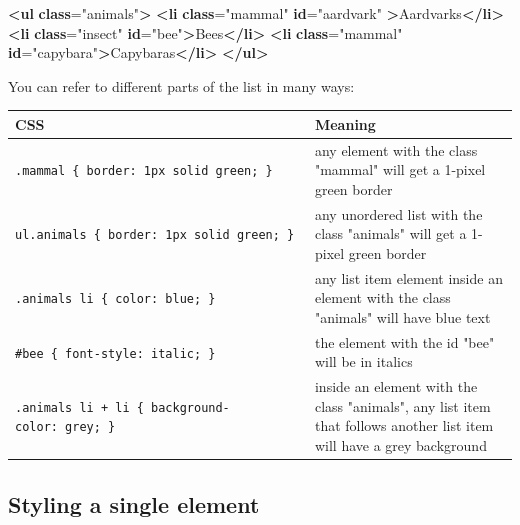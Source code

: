 \documentclass[
  oneside]{book}
\newenvironment{Shaded}{\begin{snugshade}}{\end{snugshade}}
\newcommand{\AttributeTok}[1]{\textcolor[rgb]{0.77,0.63,0.00}{#1}}
\newcommand{\ErrorTok}[1]{\textcolor[rgb]{0.64,0.00,0.00}{\textbf{#1}}}
\newcommand{\KeywordTok}[1]{\textcolor[rgb]{0.13,0.29,0.53}{\textbf{#1}}}
\newcommand{\NormalTok}[1]{#1}
\newcommand{\OtherTok}[1]{\textcolor[rgb]{0.56,0.35,0.01}{#1}}
\newcommand{\StringTok}[1]{\textcolor[rgb]{0.31,0.60,0.02}{#1}}
\begin{document}
\begin{Shaded}
\begin{Highlighting}[]
\KeywordTok{\textless{}ul} \ErrorTok{class}\OtherTok{=}\StringTok{"animals"}\KeywordTok{\textgreater{}}
    \KeywordTok{\textless{}li} \ErrorTok{class}\OtherTok{=}\StringTok{"mammal"} \ErrorTok{id}\OtherTok{=}\StringTok{"aardvark"} \KeywordTok{\textgreater{}}\NormalTok{Aardvarks}\KeywordTok{\textless{}/li\textgreater{}}
    \KeywordTok{\textless{}li} \ErrorTok{class}\OtherTok{=}\StringTok{"insect"} \ErrorTok{id}\OtherTok{=}\StringTok{"bee"}\KeywordTok{\textgreater{}}\NormalTok{Bees}\KeywordTok{\textless{}/li\textgreater{}}
    \KeywordTok{\textless{}li} \ErrorTok{class}\OtherTok{=}\StringTok{"mammal"} \ErrorTok{id}\OtherTok{=}\StringTok{"capybara"}\KeywordTok{\textgreater{}}\NormalTok{Capybaras}\KeywordTok{\textless{}/li\textgreater{}}
\KeywordTok{\textless{}/ul\textgreater{}}
\end{Highlighting}
\end{Shaded}

You can refer to different parts of the list in many ways:

\begin{longtable}[]{@{}
  >{\raggedright\arraybackslash}p{}
  >{\raggedright\arraybackslash}p{}@{}}
\toprule
CSS & Meaning \\
\midrule
\endhead
\texttt{.mammal\ \{\ border:\ 1px\ solid\ green;\ \}} & any element with the \AttributeTok{class} \StringTok{"mammal"} will get a 1-pixel green border \\
\texttt{ul.animals\ \{\ border:\ 1px\ solid\ green;\ \}} & any unordered list with the \AttributeTok{class} \StringTok{"animals"} will get a 1-pixel green border \\
\texttt{.animals\ li\ \{\ color:\ blue;\ \}} & any list item element inside an element with the \AttributeTok{class} \StringTok{"animals"} will have blue text \\
\texttt{\#bee\ \{\ font-style:\ italic;\ \}} & the element with the \AttributeTok{id} \StringTok{"bee"} will be in italics \\
\texttt{.animals\ li\ +\ li\ \{\ background-color:\ grey;\ \}} & inside an element with the \AttributeTok{class} \StringTok{"animals"}, any list item that follows another list item will have a grey background \\
\bottomrule
\end{longtable}

\hypertarget{styling-a-single-element}{%
\subsection{Styling a single element}\label{styling-a-single-element}}
\end{document}
